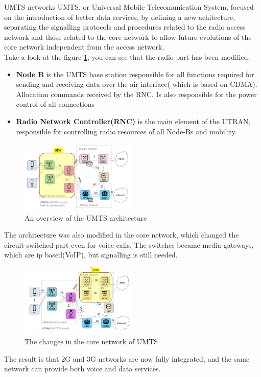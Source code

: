 \begin{section}{UMTS networks}
  UMTS, or Universal Mobile Telecomunication System, focused on the introduction of better data
  services, by defining a new achitecture, separating the signalling protocols and procedures
  related to the radio access network and those related to the core network to allow future
  evolutions of the core network independent from the access network.\\

  Take a look at the figure \ref{fig:umts-architecture}, you can see that the radio part has been
  modified:
  \begin{itemize}
    \item \textbf{Node B} is the UMTS base station responsible for all functions required for
      sending and receiving data over the air interface( which is based on CDMA). Allocation
      commands received by the RNC. Is also responsible for the power control of all connections
    \item \textbf{Radio Network Controller(RNC)} is the main element of the UTRAN, responsible for
      controlling radio resources of all Node-Bs and mobility. 
  \end{itemize}

  \begin{figure}[h]
    \centering
    \includegraphics[width=0.5\textwidth]{img/wireless/umts architecture.png}
    \caption{An overview of the UMTS architecture}
    \label{fig:umts-architecture}
  \end{figure}
  The architecture was also modified in the core network, which changed the circuit-switched
  part even for voice calls. The switches became media gateways, which are ip based(VoIP), but
  signalling is still needed.\\
  \begin{figure}[h]
    \centering
    \includegraphics[width=0.5\textwidth]{img/wireless/umts 2.png}
    \caption{The changes in the core network of UMTS}
    \label{fig:umts-core}
  \end{figure}
  The result is that 2G and 3G networks are now fully integrated, and the same network can provide
  both voice and data services.\\


\end{section}

